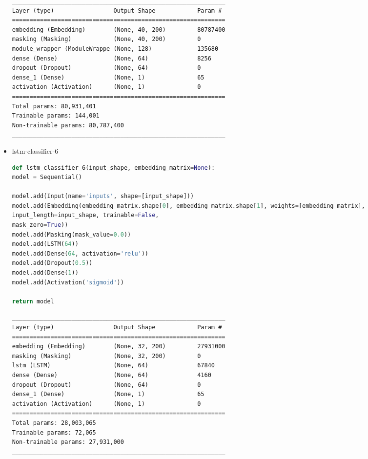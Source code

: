 \documentclass{article}
\begin{document}
\begin{itemize}
\begin{lstlisting}[numbers=none, caption=Обобщение на lstm-classifier-5.]
_____________________________________________________________
Layer (type)                 Output Shape            Param #
=============================================================
embedding (Embedding)        (None, 40, 200)         80787400
masking (Masking)            (None, 40, 200)         0
module_wrapper (ModuleWrappe (None, 128)             135680
dense (Dense)                (None, 64)              8256
dropout (Dropout)            (None, 64)              0
dense_1 (Dense)              (None, 1)               65
activation (Activation)      (None, 1)               0
=============================================================
Total params: 80,931,401
Trainable params: 144,001
Non-trainable params: 80,787,400
_____________________________________________________________
\end{lstlisting}

\item lstm-classifier-6

\begin{lstlisting}[language=Python, caption=Дефиниция на lstm-classifier-6.]
def lstm_classifier_6(input_shape, embedding_matrix=None):
model = Sequential()

model.add(Input(name='inputs', shape=[input_shape]))
model.add(Embedding(embedding_matrix.shape[0], embedding_matrix.shape[1], weights=[embedding_matrix],
input_length=input_shape, trainable=False,
mask_zero=True))
model.add(Masking(mask_value=0.0))
model.add(LSTM(64))
model.add(Dense(64, activation='relu'))
model.add(Dropout(0.5))
model.add(Dense(1))
model.add(Activation('sigmoid'))

return model
\end{lstlisting}

\begin{lstlisting}[numbers=none, caption=Обобщение на lstm-classifier-6.]
_____________________________________________________________
Layer (type)                 Output Shape            Param #
=============================================================
embedding (Embedding)        (None, 32, 200)         27931000
masking (Masking)            (None, 32, 200)         0
lstm (LSTM)                  (None, 64)              67840
dense (Dense)                (None, 64)              4160
dropout (Dropout)            (None, 64)              0
dense_1 (Dense)              (None, 1)               65
activation (Activation)      (None, 1)               0
=============================================================
Total params: 28,003,065
Trainable params: 72,065
Non-trainable params: 27,931,000
_____________________________________________________________
\end{lstlisting}


\end{itemize}
\end{document}
